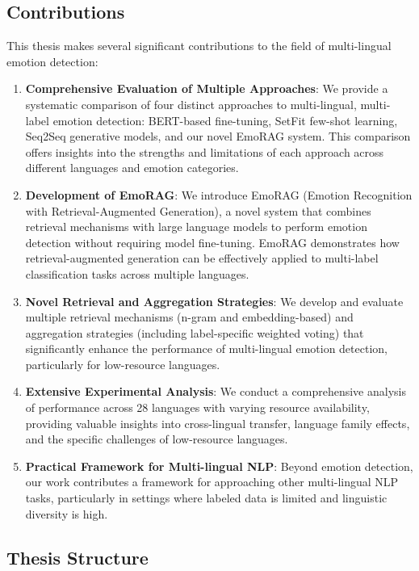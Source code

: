 \documentclass[a4paper,12pt]{extarticle}
\begin{document}
\subsection{Contributions}

This thesis makes several significant contributions to the field of multi-lingual emotion detection:

\begin{enumerate}
\item \textbf{Comprehensive Evaluation of Multiple Approaches}: We provide a systematic comparison of four distinct approaches to multi-lingual, multi-label emotion detection: BERT-based fine-tuning, SetFit few-shot learning, Seq2Seq generative models, and our novel EmoRAG system. This comparison offers insights into the strengths and limitations of each approach across different languages and emotion categories.

\item \textbf{Development of EmoRAG}: We introduce EmoRAG (Emotion Recognition with Retrieval-Augmented Generation), a novel system that combines retrieval mechanisms with large language models to perform emotion detection without requiring model fine-tuning. EmoRAG demonstrates how retrieval-augmented generation can be effectively applied to multi-label classification tasks across multiple languages.

\item \textbf{Novel Retrieval and Aggregation Strategies}: We develop and evaluate multiple retrieval mechanisms (n-gram and embedding-based) and aggregation strategies (including label-specific weighted voting) that significantly enhance the performance of multi-lingual emotion detection, particularly for low-resource languages.

\item \textbf{Extensive Experimental Analysis}: We conduct a comprehensive analysis of performance across 28 languages with varying resource availability, providing valuable insights into cross-lingual transfer, language family effects, and the specific challenges of low-resource languages.

\item \textbf{Practical Framework for Multi-lingual NLP}: Beyond emotion detection, our work contributes a framework for approaching other multi-lingual NLP tasks, particularly in settings where labeled data is limited and linguistic diversity is high.
\end{enumerate}

\subsection{Thesis Structure}
\end{document}
